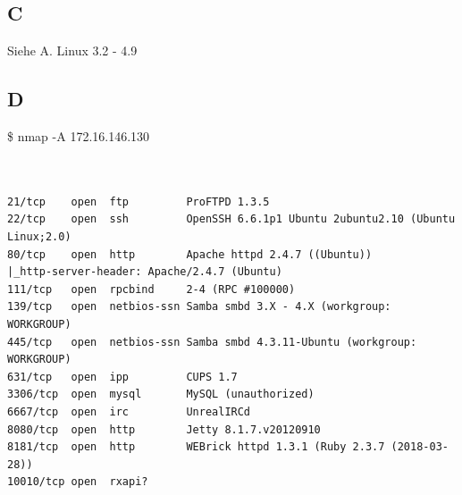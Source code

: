 \documentclass[a4paper,10pt]{article}
\begin{document}
\subsection{C}
Siehe A. Linux 3.2 - 4.9
\subsection{D}
\$ nmap -A 172.16.146.130
\\
\begin{verbatim}
 

21/tcp    open  ftp         ProFTPD 1.3.5
22/tcp    open  ssh         OpenSSH 6.6.1p1 Ubuntu 2ubuntu2.10 (Ubuntu Linux;2.0)
80/tcp    open  http        Apache httpd 2.4.7 ((Ubuntu))
|_http-server-header: Apache/2.4.7 (Ubuntu)
111/tcp   open  rpcbind     2-4 (RPC #100000)
139/tcp   open  netbios-ssn Samba smbd 3.X - 4.X (workgroup: WORKGROUP)
445/tcp   open  netbios-ssn Samba smbd 4.3.11-Ubuntu (workgroup: WORKGROUP)
631/tcp   open  ipp         CUPS 1.7
3306/tcp  open  mysql       MySQL (unauthorized)
6667/tcp  open  irc         UnrealIRCd
8080/tcp  open  http        Jetty 8.1.7.v20120910
8181/tcp  open  http        WEBrick httpd 1.3.1 (Ruby 2.3.7 (2018-03-28))
10010/tcp open  rxapi?

\end{verbatim}
\end{document}
